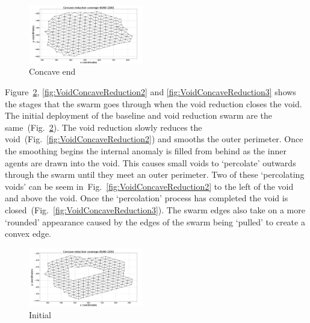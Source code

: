 \documentclass[preprint,12pt]{elsarticle}
\begin{document}
\begin{figure}
\begin{center}
\includegraphics[width=5cm]{figures/Concave4560End}
\end{center}
\caption{Concave end\label{fig:ConcaveEndPoint4560}}
\end{figure}

Figure~\ref{fig:VoidConcaveReduction1}, \ref{fig:VoidConcaveReduction2} and \ref{fig:VoidConcaveReduction3} shows the stages that the swarm goes through when the void reduction closes the void. The initial deployment of the baseline and void reduction swarm are the same~(Fig.~\ref{fig:VoidConcaveReduction1}). The void reduction slowly reduces the void~(Fig.~\ref{fig:VoidConcaveReduction2}) and smooths the outer perimeter. Once the smoothing begins the internal anomaly is filled from behind as the inner agents are drawn into the void. This causes small voids to `percolate' outwards through the swarm until they meet an outer perimeter. Two of these `percolating voids' can be seem in~Fig.~\ref{fig:VoidConcaveReduction2} to the left of the void and above the void. Once the `percolation' process has completed the void is closed~(Fig.~\ref{fig:VoidConcaveReduction3}). The swarm edges also take on a more `rounded' appearance caused by the edges of the swarm being `pulled' to create a convex edge.

\begin{figure}
\begin{center}
\includegraphics[width=5cm]{figures/Concave4560-1}
\end{center}
\caption{Initial\label{fig:VoidConcaveReduction1}}
\end{figure}
\end{document}
